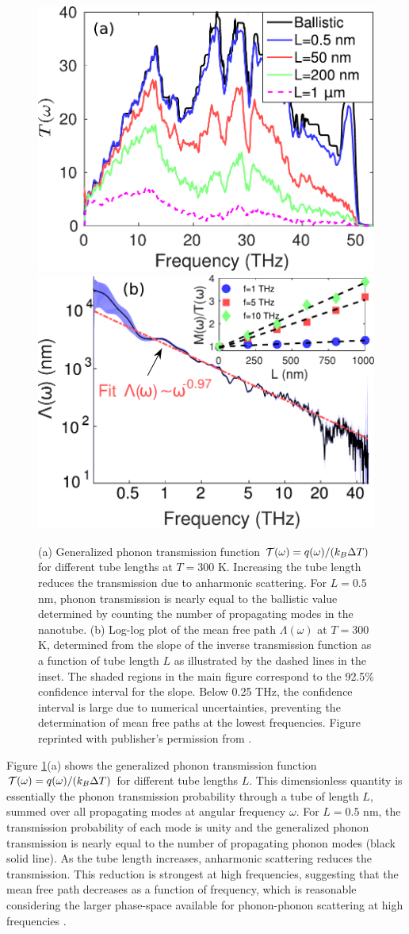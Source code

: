 \begin{figure}[tb]
 \begin{center}
  \includegraphics[width=.49\columnwidth]{pics/cnt_fig2_mod.pdf} 
  \includegraphics[width=.49\columnwidth]{pics/cnt_fig4_new.pdf} 
  \caption{(a) Generalized phonon transmission function $\mathcal{T}(\omega)=q(\omega)/(k_B\Delta T)$ for different tube lengths at $T=300$ K. Increasing the tube length reduces the transmission due to anharmonic scattering. For $L=0.5$ nm, phonon transmission is nearly equal to the ballistic value determined by counting the number of propagating modes in the nanotube. (b) Log-log plot of the mean free path $\Lambda(\omega)$ at $T=300$ K, determined from the slope of the inverse transmission function as a function of tube length $L$ as illustrated by the dashed lines in the inset. The shaded regions in the main figure correspond to the 92.5\% confidence interval for the slope. Below 0.25 THz, the confidence interval is large due to numerical uncertainties, preventing the determination of mean free paths at the lowest frequencies. Figure reprinted with publisher's permission from .}  
\label{fig:cnt_fig2}
 \end{center}
\end{figure}

Figure \ref{fig:cnt_fig2}(a) shows the generalized phonon transmission function $\mathcal{T}(\omega)=q(\omega)/(k_B\Delta T)$ for different tube lengths $L$. This dimensionless quantity is essentially the phonon transmission probability through a tube of length $L$, summed over all propagating modes at angular frequency $\omega$. For $L=0.5$ nm, the transmission probability of each mode is unity and the generalized phonon transmission is nearly equal to the number of propagating phonon modes (black solid line). As the tube length increases, anharmonic scattering reduces the transmission. This reduction is strongest at high frequencies, suggesting that the mean free path decreases as a function of frequency, which is reasonable considering the larger phase-space available for phonon-phonon scattering at high frequencies \cite{ziman}.

